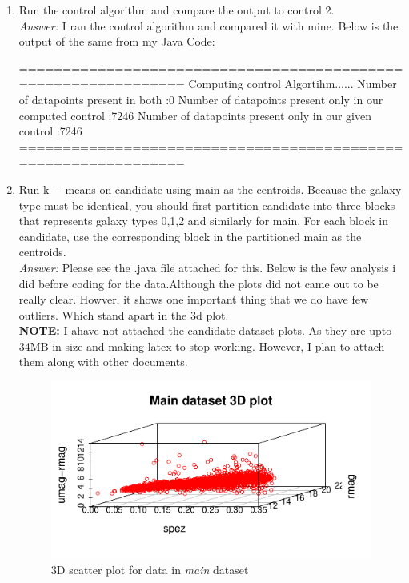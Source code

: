 \documentclass{article}
\begin{document}
\begin{enumerate}[1.]
\begin{enumerate}[(i)]
			\end{enumerate}

	\item Run the control algorithm and compare the output to control 2.\\
	\emph{Answer:} I ran the control algorithm and compared it with mine. Below is the output of the same from my Java Code:
	\begin{Soutput}
===============================================================
Computing control Algortihm......
Number of datapoints present in both    :0
Number of datapoints present only in our computed control       :7246
Number of datapoints present only in our given control  :7246
===============================================================
	\end{Soutput}

	\item Run k − means on candidate using main as the centroids. Because the galaxy type must be identical, you should first partition candidate into three blocks that represents galaxy types 0,1,2 and similarly for main. For each block in candidate, use the corresponding block in the partitioned main as the centroids.\\
	\emph{Answer:} Please see the .java file attached for this. Below is the few analysis i did before coding for the data.Although the plots did not came out to be really clear. Howver, it shows one important thing that we do have few outliers. Which stand apart in the 3d plot. \\
\textbf{NOTE:} I ahave not attached the candidate dataset plots. As they are upto 34MB in size and making latex to stop working. However, I plan to attach them along with other documents.
\begin{figure}
\includegraphics{main3dScatterPlot.pdf}
\caption{ 3D scatter plot for data in \emph{main} dataset}


\end{figure}
\end{enumerate}
\end{document}

